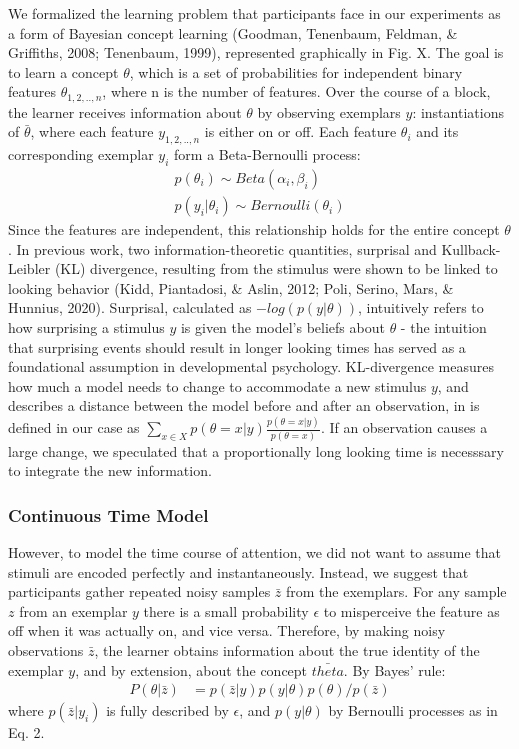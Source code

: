 \documentclass[10pt, letterpaper]{article}
\begin{document}
We formalized the learning problem that participants face in our
experiments as a form of Bayesian concept learning (Goodman, Tenenbaum,
Feldman, \& Griffiths, 2008; Tenenbaum, 1999), represented graphically
in Fig. X. The goal is to learn a concept \(\theta\), which is a set of
probabilities for independent binary features \(\theta_{1,2,..,n}\),
where n is the number of features. Over the course of a block, the
learner receives information about \(\theta\) by observing exemplars
\(y\): instantiations of \(\bar{\theta}\), where each feature
\(y_{1,2,..,n}\) is either on or off. Each feature \(\theta_i\) and its
corresponding exemplar \(y_i\) form a Beta-Bernoulli process:
\begin{eqnarray}
p(\theta_i) \sim Beta(\alpha_i,\beta_i) \\
p(y_i|\theta_i) \sim Bernoulli(\theta_i)
\end{eqnarray} Since the features are independent, this relationship
holds for the entire concept \(\theta\). In previous work, two
information-theoretic quantities, surprisal and Kullback-Leibler (KL)
divergence, resulting from the stimulus were shown to be linked to
looking behavior (Kidd, Piantadosi, \& Aslin, 2012; Poli, Serino, Mars,
\& Hunnius, 2020). Surprisal, calculated as \(-log(p(y|\theta))\),
intuitively refers to how surprising a stimulus \(y\) is given the
model's beliefs about \(\theta\) - the intuition that surprising events
should result in longer looking times has served as a foundational
assumption in developmental psychology. KL-divergence measures how much
a model needs to change to accommodate a new stimulus \(y\), and
describes a distance between the model before and after an observation,
in is defined in our case as
\(\sum_{x \in X}{p(\theta = x|y)\frac{p(\theta = x|y)}{p(\theta = x)}}\).
If an observation causes a large change, we speculated that a
proportionally long looking time is necesssary to integrate the new
information.

\hypertarget{continuous-time-model}{%
\subsubsection{Continuous Time Model}\label{continuous-time-model}}

However, to model the time course of attention, we did not want to
assume that stimuli are encoded perfectly and instantaneously. Instead,
we suggest that participants gather repeated noisy samples \(\bar{z}\)
from the exemplars. For any sample \(z\) from an exemplar \(y\) there is
a small probability \(\epsilon\) to misperceive the feature as off when
it was actually on, and vice versa. Therefore, by making noisy
observations \(\bar{z}\), the learner obtains information about the true
identity of the exemplar \(y\), and by extension, about the concept
\(\bar{theta}\). By Bayes' rule: \begin{eqnarray}
P(\theta|\bar{z}) &= p(\bar{z}|y) p(y|\theta) p(\theta) / p(\bar{z})
\end{eqnarray} where \(p(\bar{z}|y_i)\) is fully described by
\(\epsilon\), and \(p(y|\theta)\) by Bernoulli processes as in Eq. 2.
\end{document}
